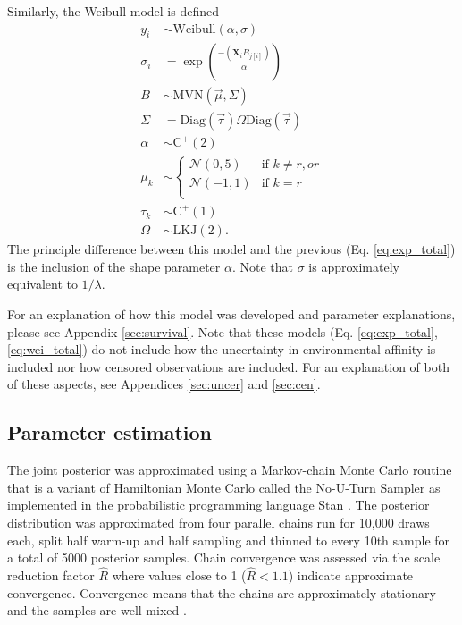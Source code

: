 \documentclass[12pt,letterpaper]{article}
\begin{document}
Similarly, the Weibull model is defined
\begin{equation}
  \begin{aligned}
    y_{i} &\sim \mathrm{Weibull}(\alpha, \sigma) \\
    \sigma_{i} &= \exp\left(\frac{-(\mathbf{X}_{i} B_{j[i]})}{\alpha}\right) \\
    B &\sim \mathrm{MVN}(\vec{\mu}, \Sigma) \\
    \Sigma &= \text{Diag}(\vec{\tau}) \Omega \text{Diag}(\vec{\tau}) \\
    \alpha &\sim \mathrm{C^{+}}(2) \\
    \mu_{k} &\sim 
    \begin{cases} 
      \mathcal{N}(0, 5) & \text{if } k \neq r, or \\
      \mathcal{N}(-1, 1) & \text{if } k = r \\ 
    \end{cases} \\
    \tau_{k} &\sim \mathrm{C^{+}}(1) \\
    \Omega &\sim \text{LKJ}(2).
  \end{aligned}
  \label{eq:wei_total}
\end{equation}
The principle difference between this model and the previous (Eq. \ref{eq:exp_total}) is the inclusion of the shape parameter \(\alpha\). Note that \(\sigma\) is approximately equivalent to \(1 / \lambda\).

For an explanation of how this model was developed and parameter explanations, please see Appendix \ref{sec:survival}. Note that these models (Eq. \ref{eq:exp_total}, \ref{eq:wei_total}) do not include how the uncertainty in environmental affinity is included nor how censored observations are included. For an explanation of both of these aspects, see Appendices \ref{sec:uncer} and \ref{sec:cen}.

\subsection{Parameter estimation}
The  joint posterior was approximated using a Markov-chain Monte Carlo routine that is a variant of Hamiltonian Monte Carlo called the No-U-Turn Sampler \citep{Hoffman2014} as implemented in the probabilistic programming language Stan \citep{2014stan}. The posterior distribution was approximated from four parallel chains run for 10,000 draws each, split half warm-up and half sampling and thinned to every 10th sample for a total of 5000 posterior samples. Chain convergence was assessed via the scale reduction factor \(\hat{R}\) where values close to 1 (\(\hat{R} < 1.1\)) indicate approximate convergence. Convergence means that the chains are approximately stationary and the samples are well mixed \citep{Gelman2013d}.
\end{document}
